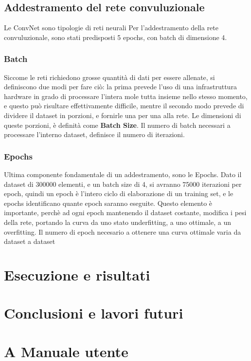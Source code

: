 \documentclass[14pt]{extarticle}
\begin{document}
\subsection{Addestramento del rete convuluzionale}
Le ConvNet sono tipologie di reti neurali 
Per l'addestramento della rete convuluzionale, sono stati predisposti 5 epochs, con batch di dimensione 4.

\subsubsection{Batch}
Siccome le reti richiedono grosse quantità di dati per essere allenate, si definiscono due modi per fare ciò: la prima prevede l'uso di una infrastruttura hardware in grado di processare l'intera mole tutta insieme nello stesso momento, e questo può risultare effettivamente difficile, mentre il secondo modo prevede di dividere il dataset in porzioni, e fornirle una per una alla rete.
Le dimensioni di queste porzioni, è definità come \textbf{Batch Size}.
Il numero di batch  necessari a processare l'interno dataset, definisce il numero di iterazioni.

\subsubsection{Epochs}
Ultima componente fondamentale di un addestramento, sono le Epochs.
Dato il dataset di 300000 elementi, e un batch size di 4, si avranno 75000 iterazioni per epoch, quindi un epoch è l'intero ciclo di elaborazione di un training set, e le epochs identificano quante epoch saranno eseguite. Questo elemento è importante, perchè ad ogni epoch mantenendo il dataset costante, modifica i pesi della rete, portando la curva da uno stato underfitting, a uno ottimale, a un overfitting. 
Il numero di epoch necesario a ottenere una curva ottimale varia da dataset a dataset
\section{Esecuzione e risultati}

\section{Conclusioni e lavori futuri}

\section{A Manuale utente}

\newpage
\printbibliography
\end{document}

